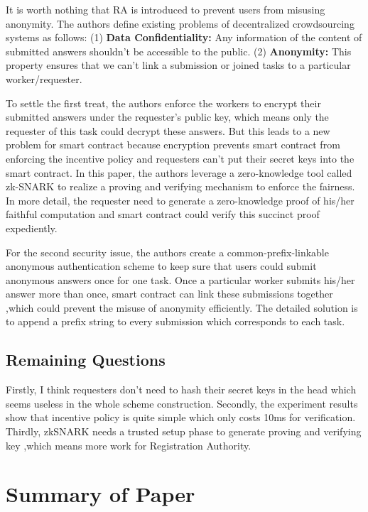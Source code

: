 \documentclass[conference]{IEEEtran}
\begin{document}
It is worth nothing that RA is introduced to prevent users from misusing anonymity. 
%
The authors define existing problems of decentralized crowdsourcing systems as follows: 
(1) \textbf{Data Confidentiality:} Any information of the content of submitted answers shouldn't be accessible to the public.  
(2) \textbf{Anonymity:} This property ensures that we can't link a submission or joined tasks to a particular worker/requester.

To settle the first treat, the authors enforce the workers to encrypt their submitted answers under the requester's public key, which means only the requester of this task could decrypt these answers.
%
But this leads to a new problem for smart contract because encryption prevents smart contract from enforcing the incentive policy and requesters can't put their secret keys into the smart contract.
%
In this paper, the authors leverage a zero-knowledge tool called zk-SNARK to realize a proving and verifying mechanism to enforce the fairness.
%
In more detail, the requester need to generate a zero-knowledge proof of his/her faithful computation and smart contract could verify this succinct proof expediently.

For the second security issue, the authors create a common-prefix-linkable anonymous authentication scheme to keep sure that users could submit anonymous answers once for one task.
%
Once a particular worker submits his/her answer more than once, smart contract can link these submissions together ,which could prevent the misuse of anonymity efficiently.
%
The detailed solution is to append a prefix string to every submission which corresponds to each task.

\subsection{Remaining Questions}
Firstly, I think requesters don't need to hash their secret keys in the head which seems useless in the whole scheme construction.
%
Secondly, the experiment results show that incentive policy is quite simple which only costs 10ms for verification.
%
Thirdly, zkSNARK needs a trusted setup phase to generate proving and verifying key ,which means more work for Registration Authority.


\section{Summary of Paper\cite{croman2016scaling}}
\end{document}
